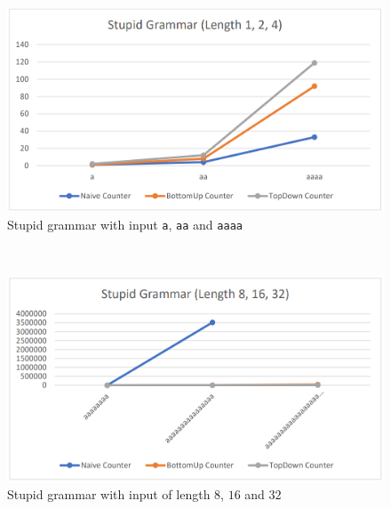 \documentclass[a4paper, 11pt]{article}
\begin{document}
\begin{minipage}{0.45\textwidth}

\begin{figure}[H]
\begin{center}
\includegraphics[scale=0.28]{diagrams/SG_1.png}
\end{center}
\caption{Stupid grammar with input \texttt{a}, \texttt{aa} and \texttt{aaaa}}
\end{figure}

\end{minipage}\begin{minipage}{0.1\textwidth}
\ 
\end{minipage}\begin{minipage}{0.45\textwidth}

\begin{figure}[H]
\begin{center}
\includegraphics[scale=0.28]{diagrams/SG_2.png}
\end{center}
\caption{Stupid grammar with input of length $8$, $16$ and $32$}
\end{figure}

\end{minipage}
\end{document}
